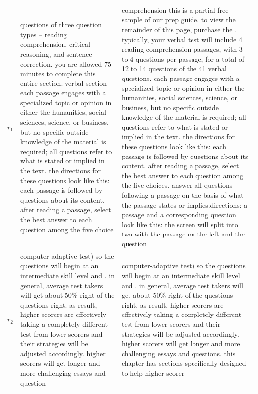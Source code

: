 \documentclass[../Book.tex]{subfiles}
\begin{document}
\begin{longtable}{@{}lp{7cm}p{7cm}@{}}
			$r_{1}$ & questions of three question types -- reading comprehension, critical reasoning, and sentence correction. you are allowed 75 minutes to complete this entire section. verbal section each passage engages with a specialized topic or opinion in either the humanities, social sciences, science, or business, but no specific outside knowledge of the material is required; all questions refer to what is stated or implied in the text. the directions for these questions look like this: each passage is followed by questions about its content. after reading a passage, select the best answer to each question among the five choice & comprehension   this is a partial free sample of our prep guide. to view the remainder of this page, purchase the .   typically, your verbal test will include 4 reading comprehension passages, with 3 to 4 questions per passage, for a total of 12 to 14 questions of the 41 verbal questions. each passage engages with a specialized topic or opinion in either the humanities, social sciences, science, or business, but no specific outside knowledge of the material is required; all questions refer to what is stated or implied in the text. the directions for these questions look like this: each passage is followed by questions about its content. after reading a passage, select the best answer to each question among the five choices. answer all questions following a passage on the basis of what the passage states or implies.directions: a passage and a corresponding question look like this: the screen will split into two with the passage on the left and the question \\
			$r_{2}$ & computer-adaptive test) so the questions will begin at an intermediate skill level and . in general, average test takers will get about 50\% right of the questions right. as result, higher scorers are effectively taking a completely different test from lower scorers and their strategies will be adjusted accordingly. higher scorers will get longer and more challenging essays and question                                                                                                                                                                                                                                         & computer-adaptive test) so the questions will begin at an intermediate skill level and . in general, average test takers will get about 50\% right of the questions right. as result, higher scorers are effectively taking a completely different test from lower scorers and their strategies will be adjusted accordingly. higher scorers will get longer and more challenging essays and questions. this chapter has sections specifically designed to help higher scorer                                                                                                                                                                                                                                                                                                                                                                                                                                                                                                                             \\

\end{longtable}
\end{document}
